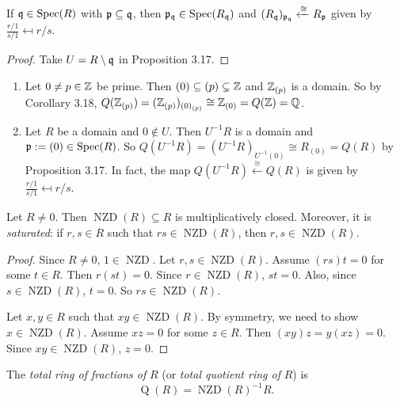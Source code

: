 \begin{corollary}
    If $\mathfrak{q} \in \operatorname{Spec}(R)$ with $\mathfrak{p} \subseteq \mathfrak{q}$, then $\mathfrak{p}_{\mathfrak{q}} \in \operatorname{Spec}(R_{\mathfrak{q}})$ and $(R_{\mathfrak{q}})_{\mathfrak{p}_{\mathfrak{q}}} \xleftarrow \cong R_{\mathfrak{p}}$ given by $\frac{r/1}{s/1} \mapsfrom r/s$.
\end{corollary}

\begin{proof}
    Take $U = R \setminus \mathfrak{q}$ in Proposition 3.17.
\end{proof}

\begin{example*}
    \begin{enumerate}
        \item Let $0 \neq p \in \mathbb{Z}$ be prime. Then $(0) \subseteq (p) \subsetneq \mathbb{Z}$ and $\mathbb{Z}_{(p)}$ is a domain. So by Corollary 3.18, $Q(\mathbb{Z}_{(p)}) = (\mathbb{Z}_{(p)})_{(0)_{(p)}} \cong \mathbb{Z}_{(0)} = Q(\mathbb{Z}) = \mathbb{Q}$. 
        \item Let $R$ be a domain and $0 \not \in U$. Then $U^{-1}R$ is a domain and $\mathfrak{p} := (0) \in \operatorname{Spec}(R)$. So $Q(U^{-1}R) = (U^{-1}R)_{U^{-1}(0)} \cong R_{(0)} = Q(R)$ by Proposition 3.17. In fact, the map $Q(U^{-1}R) \xleftarrow \cong Q(R)$ is given by $\frac{r/1}{s/1} \mapsfrom r/s$.
    \end{enumerate}
\end{example*}

\begin{proposition}
    Let $R \neq 0$. Then $\operatorname{NZD}(R) \subseteq R$ is multiplicatively closed. Moreover, it is \emph{saturated}: if $r,s \in R$ such that $rs \in \operatorname{NZD}(R)$, then $r,s \in \operatorname{NZD}(R)$. 
\end{proposition}

\begin{proof}
    Since $R \neq 0$, $1 \in \operatorname{NZD}$. Let $r,s \in \operatorname{NZD}(R)$. Assume $(rs)t=0$ for some $t \in R$. Then $r(st) = 0$. Since $r \in \operatorname{NZD}(R)$, $st = 0$. Also, since $s \in \operatorname{NZD}(R)$, $t = 0$. So $rs \in \operatorname{NZD}(R)$. \par 
    Let $x,y \in R$ such that $xy \in \operatorname{NZD}(R)$. By symmetry, we need to show $x \in \operatorname{NZD}(R)$. Assume $xz = 0$ for some $z \in R$. Then $(xy)z = y(xz) = 0$. Since $xy \in \operatorname{NZD}(R)$, $z = 0$.
\end{proof}

\begin{definition}
    The \emph{total ring of fractions of} $R$ (or \emph{total quotient ring of }$R$) is 
    \[\operatorname{Q}(R) = \operatorname{NZD}(R)^{-1}R.\]
\end{definition}

